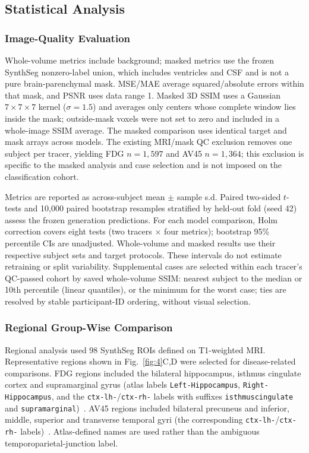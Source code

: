 \documentclass{article}
\begin{document}
\subsection{Statistical Analysis}
\subsubsection{Image-Quality Evaluation}
Whole-volume metrics include background; masked metrics use the frozen SynthSeg nonzero-label union, which includes ventricles and CSF and is not a pure brain-parenchymal mask. MSE/MAE average squared/absolute errors within that mask, and PSNR uses data range 1. Masked 3D SSIM uses a Gaussian $7\times7\times7$ kernel ($\sigma=1.5$) and averages only centers whose complete window lies inside the mask; outside-mask voxels were not set to zero and included in a whole-image SSIM average. The masked comparison uses identical target and mask arrays across models. The existing MRI/mask QC exclusion removes one subject per tracer, yielding FDG $n=1,597$ and AV45 $n=1,364$; this exclusion is specific to the masked analysis and case selection and is not imposed on the classification cohort.

Metrics are reported as across-subject mean $\pm$ sample s.d. Paired two-sided $t$-tests and 10,000 paired bootstrap resamples stratified by held-out fold (seed 42) assess the frozen generation predictions. For each model comparison, Holm correction covers eight tests (two tracers $\times$ four metrics); bootstrap 95\% percentile CIs are unadjusted. Whole-volume and masked results use their respective subject sets and target protocols. These intervals do not estimate retraining or split variability. Supplemental cases are selected within each tracer's QC-passed cohort by saved whole-volume SSIM: nearest subject to the median or 10th percentile (linear quantiles), or the minimum for the worst case; ties are resolved by stable participant-ID ordering, without visual selection.
\subsubsection{Regional Group-Wise Comparison}

Regional analysis used 98 SynthSeg ROIs defined on T1-weighted MRI. Representative regions shown in Fig.~\ref{fig:4}C,D were selected for disease-related comparisons. FDG regions included the bilateral hippocampus, isthmus cingulate cortex and supramarginal gyrus (atlas labels \texttt{Left-Hippocampus}, \texttt{Right-Hippocampus}, and the \texttt{ctx-lh-}/\allowbreak\texttt{ctx-rh-} labels with suffixes \texttt{isthmuscingulate} and \texttt{supramarginal})~\cite{mosconi2005reduced,he2015meta,strom2022cortical}. AV45 regions included bilateral precuneus and inferior, middle, superior and transverse temporal gyri (the corresponding \texttt{ctx-lh-}/\allowbreak\texttt{ctx-rh-} labels)~\cite{wong2010in}. Atlas-defined names are used rather than the ambiguous temporoparietal-junction label.
\end{document}

